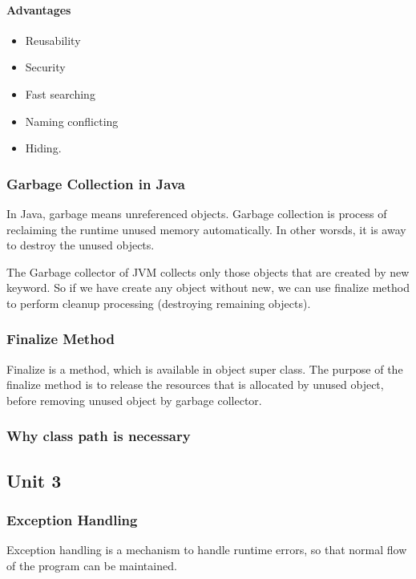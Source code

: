 \documentclass[twocolumn, a4paper]{article}
\begin{document}
\subsection{Advantages}
\begin{itemize}
  \item Reusability
  \item Security
  \item Fast searching
  \item Naming conflicting
  \item Hiding.
\end{itemize}

\section{Garbage Collection in Java}
In Java, garbage means unreferenced objects.
Garbage collection is process of reclaiming the runtime unused memory
automatically. In other worsds, it is away to destroy the unused objects.

The Garbage collector of JVM collects only those objects that are created by
new keyword. So if we have create any object without new, we can use finalize
method to perform cleanup processing (destroying remaining objects).

\section{Finalize Method}
Finalize is a method, which is available in object super class. The purpose of
the finalize method is to release the resources that is allocated by unused
object, before removing unused object by garbage collector.

\section{Why class path is necessary}

\begin{tcolorbox}%
  \part{Unit 3}
\end{tcolorbox}
\section{Exception Handling}
Exception handling is a mechanism to handle runtime errors, so that normal
flow of the program can be maintained.
\end{document}
